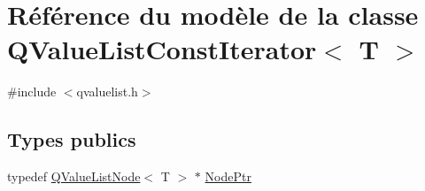 \hypertarget{class_q_value_list_const_iterator}{}\section{Référence du modèle de la classe Q\+Value\+List\+Const\+Iterator$<$ T $>$}
\label{class_q_value_list_const_iterator}


{\ttfamily \#include $<$qvaluelist.\+h$>$}

\subsection*{Types publics}
\begin{DoxyCompactItemize}
\item 
typedef \hyperlink{class_q_value_list_node}{Q\+Value\+List\+Node}$<$ T $>$ $\ast$ \hyperlink{class_q_value_list_const_iterator_a2416aa81d7180a7e83fd7ddc334ec5d1}{Node\+Ptr}
\end{DoxyCompactItemize}
